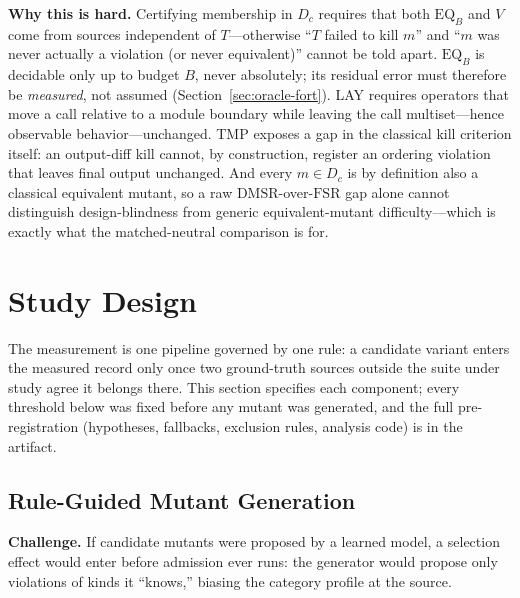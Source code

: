 \documentclass[conference]{IEEEtran}
\newcommand{\dmsr}{\mathrm{DMSR}}
\newcommand{\fsr}{\mathrm{FSR}}
\newcommand{\eqb}{\mathrm{EQ}_B}
\begin{document}
\textbf{Why this is hard.} Certifying membership in $D_c$ requires that both $\eqb$ and $V$ come from sources independent of $T$---otherwise ``$T$ failed to kill $m$'' and ``$m$ was never actually a violation (or never equivalent)'' cannot be told apart. $\eqb$ is decidable only up to budget $B$, never absolutely; its residual error must therefore be \emph{measured}, not assumed (Section~\ref{sec:oracle-fort}). LAY requires operators that move a call relative to a module boundary while leaving the call multiset---hence observable behavior---unchanged. TMP exposes a gap in the classical kill criterion itself: an output-diff kill cannot, by construction, register an ordering violation that leaves final output unchanged. And every $m \in D_c$ is by definition also a classical equivalent mutant, so a raw $\dmsr$-over-$\fsr$ gap alone cannot distinguish design-blindness from generic equivalent-mutant difficulty---which is exactly what the matched-neutral comparison is for.

\section{Study Design}\label{sec:design}

The measurement is one pipeline governed by one rule: a candidate variant enters the measured record only once two ground-truth sources outside the suite under study agree it belongs there. This section specifies each component; every threshold below was fixed before any mutant was generated, and the full pre-registration (hypotheses, fallbacks, exclusion rules, analysis code) is in the artifact.

\subsection{Rule-Guided Mutant Generation}\label{sec:generation}

\textbf{Challenge.} If candidate mutants were proposed by a learned model, a selection effect would enter before admission ever runs: the generator would propose only violations of kinds it ``knows,'' biasing the category profile at the source.
\end{document}
